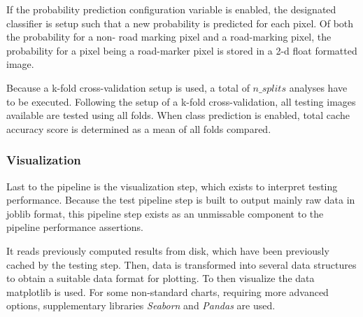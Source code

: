 If the probability prediction configuration variable is enabled, the designated classifier is setup such that a new probability is predicted for each pixel. Of both the probability for a non- road marking pixel and a road-marking pixel, the probability for a pixel being a road-marker pixel is stored in a 2-d float formatted image.

Because a k-fold cross-validation setup is used, a total of $n\_splits$ analyses have to be executed. Following the setup of a k-fold cross-validation, all testing images available are tested using all folds. When class prediction is enabled, total cache accuracy score is determined as a mean of all folds compared.

\subsubsection{Visualization}
Last to the pipeline is the visualization step, which exists to interpret testing performance. Because the test pipeline step is built to output mainly raw data in joblib format, this pipeline step exists as an unmissable component to the pipeline performance assertions.

It reads previously computed results from disk, which have been previously cached by the testing step. Then, data is transformed into several data structures to obtain a suitable data format for plotting. To then visualize the data matplotlib \citep{hunter2007matplotlib} is used. For some non-standard charts, requiring more advanced options, supplementary libraries \textit{Seaborn} and \textit{Pandas} \citep{mckinney-proc-scipy-2010} are used.